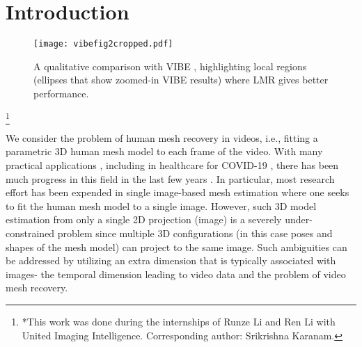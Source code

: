 \documentclass[10pt,twocolumn,letterpaper]{article}
\newcommand\blfootnote[1]{\begingroup
  \renewcommand\thefootnote{}\footnote{#1}\addtocounter{footnote}{-1}\endgroup
}
\begin{document}
\section{Introduction}
\label{sec:intro}


\begin{figure}[h!]
\centering
\texttt{[image: vibefig2cropped.pdf]}
\caption{A qualitative comparison with VIBE \cite{kocabas2019vibe}, highlighting local regions (ellipses that show zoomed-in VIBE results) where LMR gives better performance.}
\label{fig:vibecomparepage2}
\end{figure}

\blfootnote{*This work was done during the internships of Runze Li and Ren Li with United Imaging Intelligence. Corresponding author: Srikrishna Karanam.}We consider the problem of human mesh recovery in videos, i.e., fitting a parametric 3D human mesh model to each frame of the video. With many practical applications \cite{singh2017darwin,martinez2018real}, including in healthcare for COVID-19 \cite{li2007automatic,ching2014patient,karanam2020towards}, there has been much progress in this field in the last few years \cite{hmrKanazawa17,kocabas2019vibe,georgakis2020hierarchical}. In particular, most research effort has been expended in single image-based mesh estimation where one seeks to fit the human mesh model to a single image. However, such 3D model estimation from only a single 2D projection (image) is a severely under-constrained problem since multiple 3D configurations (in this case poses and shapes of the mesh model) can project to the same image. Such ambiguities can be addressed by utilizing an extra dimension that is typically associated with images- the temporal dimension leading to video data and the problem of video mesh recovery.
\end{document}
